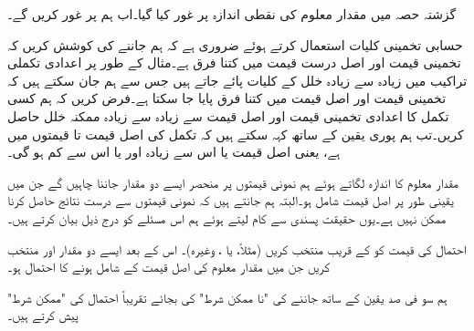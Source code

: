 گزشتہ حصہ میں مقدار معلوم کی نقطی اندازہ پر غور کیا گیا۔اب ہم  پر غور کریں گے۔

حسابی تخمینی کلیات استعمال کرتے ہوئے ضروری ہے کہ ہم جاننے کی کوشش کریں کہ  تخمینی قیمت اور اصل درست قیمت میں کتنا فرق ہے۔مثال کے طور پر اعدادی تکملی تراکیب میں زیادہ سے زیادہ خلل کے کلیات پائے جاتے ہیں جس سے ہم جان سکتے ہیں کہ تخمینی قیمت اور  اصل قیمت میں کتنا فرق پایا جا سکتا ہے۔فرض کریں کہ ہم کسی تکمل کا اعدادی تخمینی قیمت   اور اصل قیمت سے زیادہ سے زیادہ ممکنہ خلل  حاصل کریں۔تب ہم پوری یقین کے ساتھ کہہ سکتے ہیں کہ تکمل کی اصل قیمت  تا   قیمتوں میں  ہے، یعنی اصل قیمت   یا اس سے زیادہ اور   یا اس سے کم ہو گی۔

مقدار معلوم  کا اندازہ  لگاتے ہوئے ہم نمونی قیمتوں پر منحصر ایسے دو مقدار جاننا چاہیں گے جن میں یقینی طور پر اصل قیمت شامل ہو۔البتہ ہم جانتے ہیں کہ نمونی قیمتوں سے   درست نتائج حاصل کرنا ممکن نہیں ہے۔یوں حقیقت پسندی سے کام  لیتے ہوئے ہم اس مسئلے کو درج ذیل بیان کرتے ہیں۔

احتمال  کی قیمت کو  کے قریب منتخب کریں (مثلاً،  یا ، وغیرہ)۔ اس کے بعد ایسے  دو مقدار  اور  منتخب کریں جن میں مقدار معلوم  کی اصل قیمت کے شامل ہونے کا احتمال  ہو۔

ہم سو فی صد یقین کے ساتھ جاننے کی "نا ممکن شرط" کی بجائے تقریباً  احتمال کی "ممکن شرط" پیش کرتے ہیں۔

